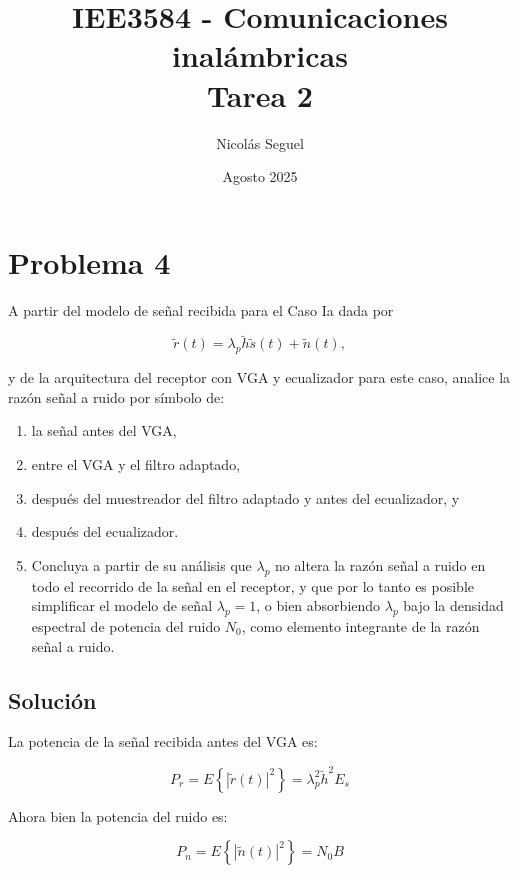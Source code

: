 \documentclass[11pt]{article}
\title{IEE3584 - Comunicaciones inalámbricas \\
Tarea 2}
\author{Nicolás Seguel}
\date{Agosto 2025}
\begin{document}
\maketitle

\section*{Problema 4}

A partir del modelo de señal recibida para el Caso Ia dada por

\[
\tilde{r}(t) = \lambda_p \breve{h} \tilde{s} (t) + \tilde{n}(t),
\]

y de la arquitectura del receptor con VGA y ecualizador para este caso, analice la razón señal a ruido por símbolo de:

\begin{enumerate}
    \item la señal antes del VGA,
    \item entre el VGA y el filtro adaptado,
    \item después del muestreador del filtro adaptado y antes del ecualizador, y
    \item después del ecualizador.
    \item Concluya a partir de su análisis que \(\lambda_p\) no altera la razón señal a ruido en todo el recorrido de la señal en el receptor, y que por lo tanto es posible simplificar el modelo de señal \(\lambda_p = 1\), o bien absorbiendo \(\lambda_p\) bajo la densidad espectral de potencia del ruido \(N_0\), como elemento integrante de la razón señal a ruido.
\end{enumerate}

\subsection*{Solución}


La potencia de la señal recibida antes del VGA es:

\begin{equation*}
    P_{r} = E\left\{|\tilde{r}(t)|^2\right\} = \lambda_p^2 \breve{h}^2 E_s
\end{equation*}

Ahora bien la potencia del ruido es:

\begin{equation*}
    P_{n} = E\left\{|\tilde{n}(t)|^2\right\} = N_0 B
\end{equation*}
\end{document}
